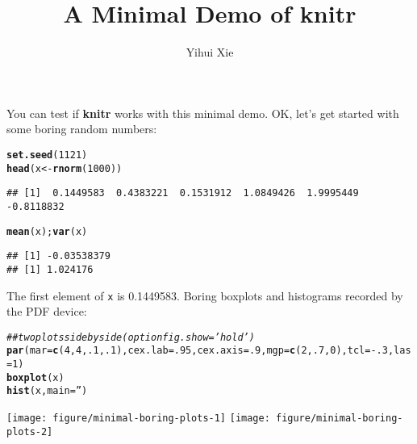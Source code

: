 \documentclass{article}\usepackage[]{graphicx}\usepackage[]{color}
\makeatletter
\newcommand{\hlnum}[1]{\textcolor[rgb]{0.686,0.059,0.569}{#1}}%
\newcommand{\hlstr}[1]{\textcolor[rgb]{0.192,0.494,0.8}{#1}}%
\newcommand{\hlcom}[1]{\textcolor[rgb]{0.678,0.584,0.686}{\textit{#1}}}%
\newcommand{\hlopt}[1]{\textcolor[rgb]{0,0,0}{#1}}%
\newcommand{\hlstd}[1]{\textcolor[rgb]{0.345,0.345,0.345}{#1}}%
\newcommand{\hlkwb}[1]{\textcolor[rgb]{0.69,0.353,0.396}{#1}}%
\newcommand{\hlkwc}[1]{\textcolor[rgb]{0.333,0.667,0.333}{#1}}%
\newcommand{\hlkwd}[1]{\textcolor[rgb]{0.737,0.353,0.396}{\textbf{#1}}}%
\newenvironment{kframe}{%
 \def\at@end@of@kframe{}%
 \ifinner\ifhmode%
  \def\at@end@of@kframe{\end{minipage}}%
  \begin{minipage}{\columnwidth}%
 \fi\fi%
 \def\FrameCommand##1{\hskip\@totalleftmargin \hskip-\fboxsep
 \colorbox{shadecolor}{##1}\hskip-\fboxsep
     \hskip-\linewidth \hskip-\@totalleftmargin \hskip\columnwidth}%
 \MakeFramed {\advance\hsize-\width
   \@totalleftmargin\z@ \linewidth\hsize
   \@setminipage}}%
 {\par\unskip\endMakeFramed%
 \at@end@of@kframe}
\newenvironment{knitrout}{}{} %
\makeatother
\begin{document}
\title{A Minimal Demo of knitr}

\author{Yihui Xie}

\maketitle
You can test if \textbf{knitr} works with this minimal demo. OK, let's
get started with some boring random numbers:

\begin{knitrout}
\color{fgcolor}\begin{kframe}
\begin{alltt}
\hlkwd{set.seed}\hlstd{(}\hlnum{1121}\hlstd{)}
\hlkwd{head}\hlstd{(x} \hlkwb{<-} \hlkwd{rnorm}\hlstd{(}\hlnum{1000}\hlstd{))}
\end{alltt}
\begin{verbatim}
## [1]  0.1449583  0.4383221  0.1531912  1.0849426  1.9995449 -0.8118832
\end{verbatim}
\begin{alltt}
\hlkwd{mean}\hlstd{(x);} \hlkwd{var}\hlstd{(x)}
\end{alltt}
\begin{verbatim}
## [1] -0.03538379
## [1] 1.024176
\end{verbatim}
\end{kframe}
\end{knitrout}

The first element of \texttt{x} is 0.1449583. Boring boxplots
and histograms recorded by the PDF device:

\begin{knitrout}
\color{fgcolor}\begin{kframe}
\begin{alltt}
\hlcom{## two plots side by side (option fig.show='hold')}
\hlkwd{par}\hlstd{(}\hlkwc{mar}\hlstd{=}\hlkwd{c}\hlstd{(}\hlnum{4}\hlstd{,}\hlnum{4}\hlstd{,}\hlnum{.1}\hlstd{,}\hlnum{.1}\hlstd{),}\hlkwc{cex.lab}\hlstd{=}\hlnum{.95}\hlstd{,}\hlkwc{cex.axis}\hlstd{=}\hlnum{.9}\hlstd{,}\hlkwc{mgp}\hlstd{=}\hlkwd{c}\hlstd{(}\hlnum{2}\hlstd{,}\hlnum{.7}\hlstd{,}\hlnum{0}\hlstd{),}\hlkwc{tcl}\hlstd{=}\hlopt{-}\hlnum{.3}\hlstd{,}\hlkwc{las}\hlstd{=}\hlnum{1}\hlstd{)}
\hlkwd{boxplot}\hlstd{(x)}
\hlkwd{hist}\hlstd{(x,}\hlkwc{main}\hlstd{=}\hlstr{''}\hlstd{)}
\end{alltt}
\end{kframe}

{\centering \texttt{[image: figure/minimal-boring-plots-1]} 
\texttt{[image: figure/minimal-boring-plots-2]} 

}



\end{knitrout}
\end{document}

